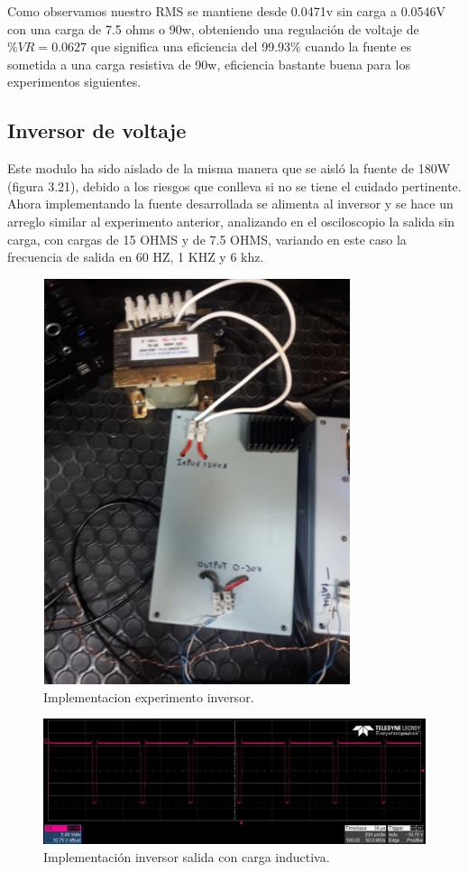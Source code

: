 Como observamos nuestro RMS se mantiene desde 0.0471v sin carga a 0.0546V con una carga de 7.5 ohms o 90w, obteniendo una regulación de voltaje de $\%VR=0.0627$ que significa una eficiencia del 99.93\% cuando la fuente es sometida a una carga resistiva de 90w, eficiencia bastante buena para los experimentos siguientes. 

\subsection{Inversor de voltaje}

Este modulo ha sido aislado de la misma manera que se aisló la fuente de 180W (figura 3.21), debido a los riesgos que conlleva si no se tiene el cuidado pertinente. Ahora implementando la fuente desarrollada se alimenta al inversor y se hace un arreglo similar al experimento anterior, analizando en el osciloscopio la salida sin carga, con cargas de 15 OHMS y de 7.5 OHMS, variando en este caso la frecuencia de salida en 60 HZ, 1 KHZ y 6 khz.



\begin{figure}[H]
\centering
\includegraphics[width=9cm]{Capitulo3/figs/fotofuente.png}
\caption{Implementacion experimento inversor.}
\end{figure}

\begin{figure}[H]
\centering
\includegraphics[width=12cm]{Capitulo3/figs/pwm1.jpg}
\caption{Implementación inversor salida con carga inductiva.}
\end{figure}

